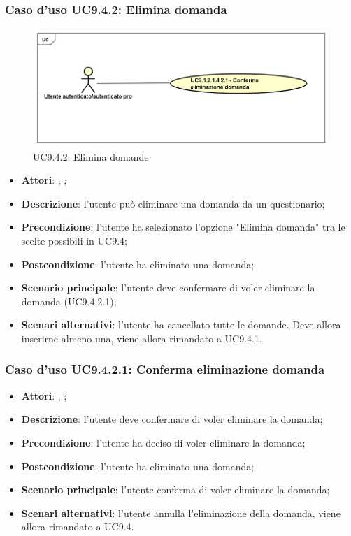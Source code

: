 		 \subsubsection{Caso d'uso UC9.4.2: Elimina domanda}
		 \label{UC9.4.2}
		 \begin{figure}[h]
		 	\centering
		 	\includegraphics[scale=0.5,keepaspectratio]{UML/UC9_1_2_1_4_2.png}
		 	\caption{UC9.4.2: Elimina domande}
		 \end{figure}
		 \FloatBarrier
		 \begin{itemize}
		 	\item \textbf{Attori}: \uau, \uaupro;
		 	\item \textbf{Descrizione}: l'utente può eliminare una domanda da un questionario;
		 	\item \textbf{Precondizione}: l'utente ha selezionato l'opzione "Elimina domanda" tra le scelte possibili in UC9.4;
		 	\item \textbf{Postcondizione}: l'utente ha eliminato una domanda;
		 	\item \textbf{Scenario principale}: l'utente deve confermare di voler eliminare la domanda (UC9.4.2.1); 
		 	\item \textbf{Scenari alternativi}: l'utente ha cancellato tutte le domande. Deve allora inserirne almeno una, viene allora rimandato a UC9.4.1.
		 \end{itemize}
		 
		 \subsubsection{Caso d'uso UC9.4.2.1: Conferma eliminazione domanda}
		 \label{UC9.4.2.1}
		 \begin{itemize}
		 	\item \textbf{Attori}: \uau, \uaupro;
		 	\item \textbf{Descrizione}: l'utente deve confermare di voler eliminare la domanda;
		 	\item \textbf{Precondizione}: l'utente ha deciso di voler eliminare la domanda;
		 	\item \textbf{Postcondizione}: l'utente ha eliminato una domanda;
		 	\item \textbf{Scenario principale}: l'utente conferma di voler eliminare la domanda;
		 	\item \textbf{Scenari alternativi}: l'utente annulla l'eliminazione della domanda, viene allora rimandato a UC9.4.
		 \end{itemize}
		
		